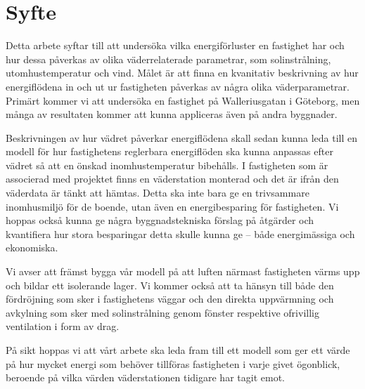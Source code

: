 \section{Syfte}
Detta arbete syftar till att undersöka vilka energiförluster en fastighet har och hur dessa påverkas av olika väderrelaterade parametrar, som solinstrålning, utomhustemperatur och vind. Målet är att finna en kvanitativ beskrivning av hur energiflödena in och ut ur fastigheten påverkas av några olika väderparametrar. Primärt kommer vi att undersöka en fastighet på Walleriusgatan i Göteborg, men många av resultaten kommer att kunna appliceras även på andra byggnader.

Beskrivningen av hur vädret påverkar energiflödena skall sedan kunna leda till en modell för hur fastighetens reglerbara energiflöden ska kunna anpassas efter vädret så att en önskad inomhustemperatur bibehålls. I fastigheten som är associerad med projektet finns en väderstation monterad och det är ifrån den väderdata är tänkt att hämtas. Detta ska inte bara ge en trivsammare inomhusmiljö för de boende, utan även en energibesparing för fastigheten. Vi hoppas också kunna ge några byggnadstekniska förslag på åtgärder och kvantifiera hur stora besparingar detta skulle kunna ge – både energimässiga och ekonomiska.

Vi avser att främst bygga vår modell på att luften närmast fastigheten värms upp och bildar ett isolerande lager. Vi kommer också att ta hänsyn till både den fördröjning som sker i fastighetens väggar och den direkta uppvärmning och avkylning som sker med solinstrålning genom fönster respektive ofrivillig ventilation i form av drag.

På sikt hoppas vi att vårt arbete ska leda fram till ett modell som ger ett värde på hur mycket energi som behöver tillföras fastigheten i varje givet ögonblick, beroende på vilka värden väderstationen tidigare har tagit emot.
